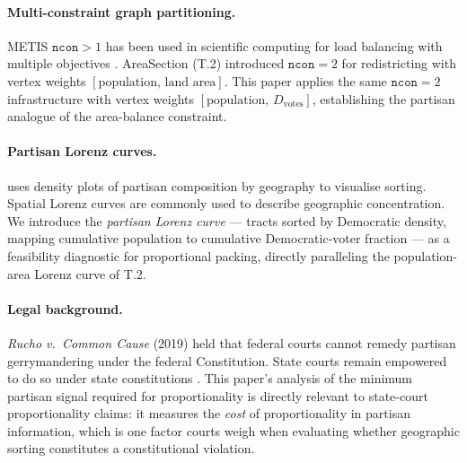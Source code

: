 \paragraph{Multi-constraint graph partitioning.}
METIS $\mathtt{ncon} > 1$ has been used in scientific computing for load
balancing with multiple objectives \citep{karypis1999metis}.
AreaSection (T.2) introduced $\mathtt{ncon}=2$ for redistricting with vertex
weights $[\text{population},\, \text{land area}]$.
This paper applies the same $\mathtt{ncon}=2$ infrastructure with vertex
weights $[\text{population},\, D_{\text{votes}}]$, establishing the partisan
analogue of the area-balance constraint.

\paragraph{Partisan Lorenz curves.}
\citet{rodden2019} uses density plots of partisan composition by geography to
visualise sorting.
Spatial Lorenz curves are commonly used to describe geographic concentration.
We introduce the \emph{partisan Lorenz curve} --- tracts sorted by Democratic
density, mapping cumulative population to cumulative Democratic-voter fraction ---
as a feasibility diagnostic for proportional packing, directly paralleling the
population-area Lorenz curve of T.2.

\paragraph{Legal background.}
\emph{Rucho v.\ Common Cause} (2019) held that federal courts cannot remedy
partisan gerrymandering under the federal Constitution.
State courts remain empowered to do so under state constitutions
\citep{lwv2018pa, harper2022nc}.
This paper's analysis of the minimum partisan signal required for proportionality
is directly relevant to state-court proportionality claims: it measures the
\emph{cost} of proportionality in partisan information, which is one factor
courts weigh when evaluating whether geographic sorting constitutes a
constitutional violation.
